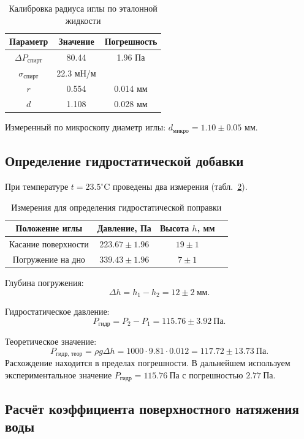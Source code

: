 \documentclass[a4paper]{article}
\begin{document}
	
	\begin{table}[h!]
		\centering
		\caption{Калибровка радиуса иглы по эталонной жидкости}
		\label{tab:calib}
		\begin{tabular}{|c|c|c|}
			\hline
			Параметр & Значение & Погрешность\\
			\hline
			\(\Delta P_{\text{спирт}}\) & 80.44 & 1.96 Па \\
			\(\sigma_{\text{спирт}}\) & 22.3 мН/м &\\
			\(r\) & 0.554 & 0.014  мм \\
			\(d\) & 1.108 & 0.028  мм \\
			\hline
		\end{tabular}
	\end{table}
	Измеренный по микроскопу диаметр иглы: \(d_{\text{микро}} = 1.10 \pm 0.05\) мм.
	\newpage
	\subsection{Определение гидростатической добавки}
	
	При температуре \(t = 23.5^\circ\text{C}\) проведены два измерения (табл.~\ref{tab:hydro_meas}).
	
	\begin{table}[h!]
		\centering
		\caption{Измерения для определения гидростатической поправки}
		\label{tab:hydro_meas}
		\begin{tabular}{|c|c|c|c|}
			\hline
			Положение иглы & Давление, Па & Высота \(h\), мм \\
			\hline
			Касание поверхности & \(223.67 \pm 1.96\) & \(19 \pm 1\) \\
			Погружение на дно & \(339.43 \pm 1.96\) & \(7 \pm 1\) \\
			\hline
		\end{tabular}
	\end{table}
	
	Глубина погружения:
	\[
	\Delta h = h_1 - h_2 = 12 \pm 2\ \text{мм}.
	\]
	
	Гидростатическое давление:
	\[
	P_{\text{гидр}} = P_2 - P_1 = 115.76 \pm 3.92\ \text{Па}.
	\]
	
	Теоретическое значение:
	\[
	P_{\text{гидр, теор}} = \rho g \Delta h = 1000 \cdot 9.81 \cdot 0.012 = 117.72 \pm 13.73\ \text{Па}.
	\]
	Расхождение находится в пределах погрешности. В дальнейшем используем экспериментальное значение
	\(P_{\text{гидр}} = 115.76\ \text{Па}\) с погрешностью \(2.77\ \text{Па}\).
	
	\subsection{Расчёт коэффициента поверхностного натяжения воды}
	
\end{document}
